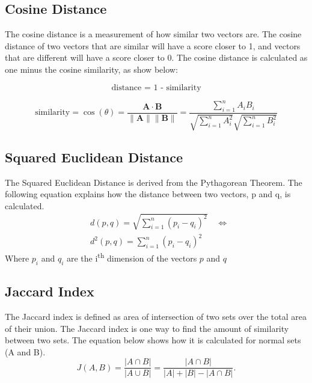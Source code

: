 \documentclass[9pt,twocolumn,twoside]{idsi}
\begin{document}
\subsection{Cosine Distance}
The cosine distance is a measurement of how similar two vectors are. The cosine distance of two vectors that are similar will have a score closer to 1, and vectors that are different will have a score closer to 0. The cosine distance is calculated as one minus the cosine similarity, as show below:

\begin{equation}
{\displaystyle {\text{distance = 1 - similarity}}}
\end{equation}

\begin{equation}
{\text{similarity}} = \cos(\theta ) = \frac{\mathbf {A} \cdot \mathbf {B} }{ \|\mathbf {A} \|\|\mathbf {B} \|}={\frac {\sum \limits _{i=1}^{n}{A_{i}B_{i}}}{{\sqrt {\sum \limits _{i=1}^{n}{A_{i}^{2}}}}{\sqrt {\sum \limits _{i=1}^{n}{B_{i}^{2}}}}}}
\end{equation}

\subsection{Squared Euclidean Distance}
The Squared Euclidean Distance is derived from the Pythagorean Theorem. The following equation explains how the distance between two vectors, p and q, is calculated.
\begin{equation}
\begin{aligned}
&d(p, q) = \sqrt{\sum \limits _{i=1}^{n}{(p_i- q_i)^2}} \quad \Longleftrightarrow \\ 
&d^2(p, q) = {\sum \limits _{i=1}^{n}{(p_i- q_i)^2}}
\end{aligned}
\end{equation}
Where $p_i$ and $q_i$ are the i\textsuperscript{th} dimension of the vectors $p$ and $q$

\subsection{Jaccard Index}
The Jaccard index is defined as area of intersection of two sets over the total area of their union. The Jaccard index is one way to find the amount of similarity between two sets. The equation below shows how it is calculated for normal sets (A and B).
\begin{equation}
 J(A,B) = {\frac{|A \cap B|}{|A \cup B|}} = {\frac{|A \cap B|}{|A| + |B| - |A \cap B|}}.
\end{equation}
\end{document}

